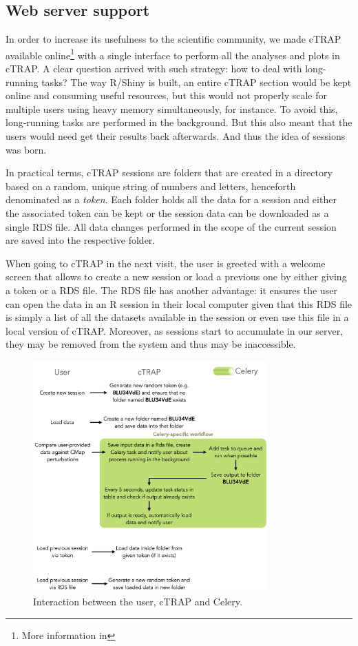 \subsection{Web server support}
\label{sec:ctrap-web}

In order to increase its usefulness to the scientific community, we made cTRAP available online\footnote{More information in } with a single interface to perform all the analyses and plots in cTRAP. A clear question arrived with such strategy: how to deal with long-running tasks? The way R/Shiny is built, an entire cTRAP section would be kept online and consuming useful resources, but this would not properly scale for multiple users using heavy memory simultaneously, for instance. To avoid this, long-running tasks are performed in the background. But this also meant that the users would need get their results back afterwards. And thus the idea of sessions was born.

In practical terms, cTRAP sessions are folders that are created in a directory based on a random, unique string of numbers and letters, henceforth denominated as a \emph{token}. Each folder holds all the data for a session and either the associated token can be kept or the session data can be downloaded as a single RDS file. All data changes performed in the scope of the current session are saved into the respective folder.

When going to cTRAP in the next visit, the user is greeted with a welcome screen that allows to create a new session or load a previous one by either giving a token or a RDS file. The RDS file has another advantage: it ensures the user can open the data in an R session in their local computer given that this RDS file is simply a list of all the datasets available in the session or even use this file in a local version of cTRAP. Moreover, as sessions start to accumulate in our server, they may be removed from the system and thus may be inaccessible.

\begin{figure}[!ht]
  \includegraphics[width=0.8\textwidth]{images/ctrap/celery}
  \centering
  \caption{Interaction between the user, cTRAP and Celery.}
\end{figure}

